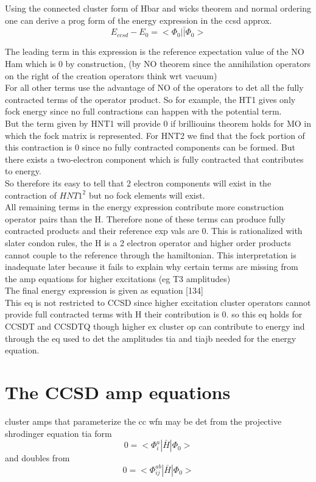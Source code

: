 \documentclass[10pt, draft]{article}
\begin{document}
Using the connected cluster form of Hbar and wicks theorem and normal ordering one can derive a prog form of the energy expression in the ccsd approx. 
\[ E_{ccsd} - E_0 = <\Phi_0|\bar|\Phi_0> \]

The leading term in this expression is the reference expectation value of the NO Ham which is 0 by construction, (by NO theorem since the annihilation operators on the right of the creation operators think wrt vacuum)\\
For all other terms use the advantage of NO of the operators to det all the fully contracted terms of the operator product.  So for example, the HT1 gives only fock energy since no full contractions can happen with the potential term.\\
But the term given by HNT1 will provide 0 if brilliouins theorem holds for MO in which the fock matrix is represented.  
For HNT2 we find that the fock portion of this contraction is 0 since no fully contracted components can be formed.  But there exists a two-electron component which is fully contracted that contributes to energy.  \\
So therefore its easy to tell that 2 electron components will exist in the contraction of $HNT1^2$ but no fock elements will exist.\\
All remaining terms in the energy expression contribute more construction operator pairs than the H.  Therefore none of these terms can produce fully contracted products and their reference exp vals are 0. This is rationalized with slater condon rules, the H is a 2 electron operator and higher order products cannot couple to the reference through the hamiltonian.  This interpretation is inadequate later because it fails to explain why certain terms are missing from the amp equations for higher excitations (eg T3 amplitudes)\\
The final energy expression is given as equation [134] \\
This eq is not restricted to CCSD since higher excitation cluster operators cannot provide full contracted terms with H their contribution is 0.  so this eq holds for CCSDT and CCSDTQ though higher ex cluster op can contribute to energy ind through the eq used to det the amplitudes tia and tiajb needed for the energy equation. 

\section{The CCSD amp equations}
cluster amps that parameterize the cc wfn may be det from the projective shrodinger equation tia form
\[ 0 = < \Phi_i^a | \bar{H}|\Phi_0> \]
 and doubles from 
 \[ 0 = < \Phi_{ij}^{ab} | \bar{H}|\Phi_0> \]
 
\end{document}
